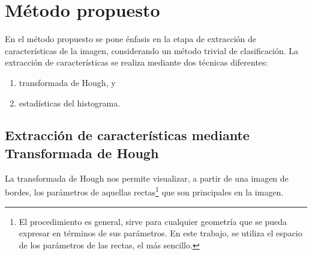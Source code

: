 \documentclass[conference,a4paper,10pt,oneside,final]{tfmpd}
\begin{document}
\section{Método propuesto}
En el método propuesto se pone énfasis en la etapa de
extracción de características de la imagen, considerando
un método trivial de clasificación.
La extracción de características se realiza %
mediante dos técnicas diferentes:
\begin{enumerate}
\item transformada de Hough, y
\item estadísticas del histograma.
\end{enumerate}
%
%
\subsection{Extracción de características mediante Transformada de Hough}
La transformada de Hough nos permite visualizar, a partir de una imagen de
bordes, los parámetros de aquellas rectas\footnote{El procedimiento es general,
sirve para cualquier geometría que se pueda expresar en términos de sus
parámetros. En este trabajo, se utiliza el espacio de los parámetros de las
rectas, el más sencillo.}
que son principales en la imagen.
\end{document}
